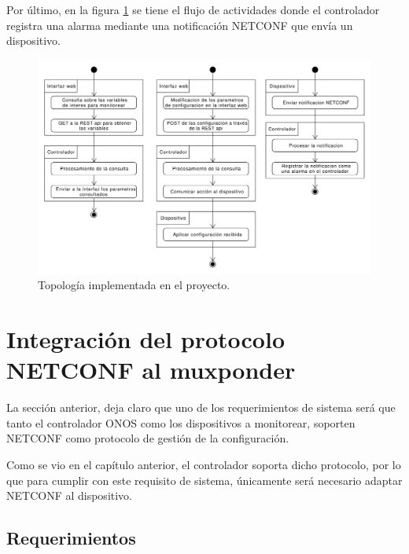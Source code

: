   Por último, en la figura \ref{fig:actividad_config} se tiene el flujo de actividades donde el controlador registra una alarma mediante una notificación NETCONF que envía un dispositivo.


  \begin{figure}[H]
    \centering
    \includegraphics[scale=0.40]{Figures/actividad_config.pdf}
    \caption{Topología implementada en el proyecto.}
    \label{fig:actividad_config}
  \end{figure}


  \section{Integración del protocolo NETCONF al muxponder}
  La sección anterior, deja claro que uno de los requerimientos de sistema será que tanto el controlador ONOS como los dispositivos a monitorear, soporten NETCONF como protocolo de gestión de la configuración. 
  
  Como se vio en el capítulo anterior, el controlador soporta dicho protocolo, por lo que para cumplir con este requisito de sistema, únicamente será necesario adaptar NETCONF al dispositivo. 
  

  \subsection{Requerimientos}

